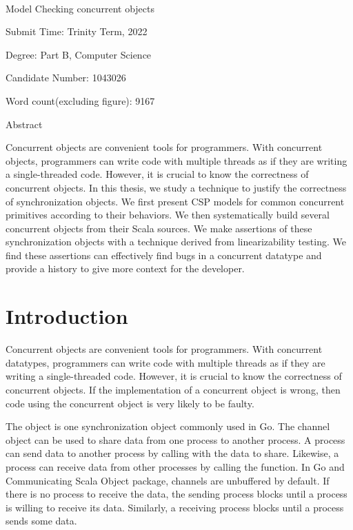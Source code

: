 \documentclass[a4paper, 12pt]{article}
\begin{document}
\pagestyle{empty}
\begin{center}
  ⠀\\⠀\\⠀\\⠀\\⠀\\⠀\\
  \begin{huge}
    Model Checking concurrent objects
  \end{huge}

  Submit Time: Trinity Term, 2022 

  Degree: Part B, Computer Science

  Candidate Number: 1043026

  Word count(excluding figure): 9167
\end{center}
\newpage

Abstract

Concurrent objects are convenient tools for programmers. With concurrent objects, programmers can write code with multiple threads as if they are writing a single-threaded code. However, it is crucial to know the correctness of concurrent objects. In this thesis, we study a technique to justify the correctness of synchronization objects. We first present CSP models for common concurrent primitives according to their behaviors. We then systematically build several concurrent objects from their Scala sources. We make assertions of these synchronization objects with a technique derived from linearizability testing. We find these assertions can effectively find bugs in a concurrent datatype and provide a history to give more context for the developer. 

\newpage

\tableofcontents
\newpage
\clearpage
\setcounter{page}{1}
\pagestyle{plain}
\section{Introduction}
Concurrent objects are convenient tools for programmers. With concurrent datatypes, programmers can write code with multiple threads as if they are writing a single-threaded code. However, it is crucial to know the correctness of concurrent objects. If the implementation of a concurrent object is wrong, then code using the concurrent object is very likely to be faulty. 

The  object is one synchronization object commonly used in Go. The channel object can be used to share data from one process to another process. A process can send data to another process by calling  with the data to share. Likewise, a process can receive data from other processes by calling the  function. In Go and Communicating Scala Object package, channels are unbuffered by default. If there is no process to receive the data, the sending process blocks until a process is willing to receive its data. Similarly, a receiving process blocks until a process sends some data. 
\end{document}
